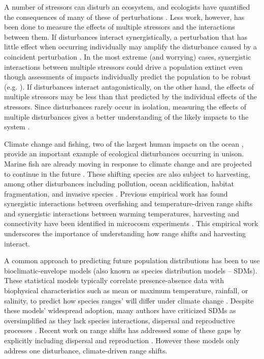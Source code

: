 \documentclass[12pt,english]{article}
\begin{document}
\begin{spacing}{1.9}
\begin{flushleft}
A number of stressors can disturb an ecosystem, and ecologists have quantified the consequences of many of these of perturbations \citep{Wilcoveetal1998, Crainetal2008, DarlingCote2008}. Less work, however, has been done to measure the effects of multiple stressors and the interactions between them.  If disturbances interact synergistically, a perturbation that has little effect when occurring individually may amplify the disturbance caused by a coincident perturbation \citep{Crainetal2008, DarlingCote2008,Nyeetal2013,Gurevitchetal2000}.   In the most extreme (and worrying) cases, synergistic interactions between multiple stressors could drive a population extinct even though assessments of impacts individually predict the population to be robust (e.g. \citet{Pelletieretal2006}).  If disturbances interact antagonistically, on the other hand, the effects of multiple stressors may be less than that predicted by the individual effects of the stressors.  Since disturbances rarely occur in isolation, measuring the effects of multiple disturbances gives a better understanding of the likely impacts to the system \citep{DoakMorris2010, Fordhametal2013, Foltetal1999}.


Climate change and fishing, two of the largest human impacts on the ocean \citep{Halpernetal2008}, provide an important example of ecological disturbances occurring in unison. Marine fish are already moving in response to climate change \citep{ Perryetal2005, HiddinkHoftstede2008, Rijnsdorpetal2009, Dulvyetal2008, Simpsonetal2011, Pinskyetal2013} and are projected to continue in the future \citep{Kelletal2005, Mackenzieetal2007}. These shifting species are also subject to harvesting, among other disturbances including pollution, ocean acidification, habitat fragmentation, and invasive species \citep{Wilcoveetal1998, Salaetal2000, MEA2005, Pinskyetal2013, Barryetal1995, Nyeetal2009}. Previous empirical work has found synergistic interactions between overfishing and temperature-driven range shifts \citep{Lingetal2009} and synergistic interactions between warming temperatures, harvesting and connectivity have been identified in microcosm experiments \citep{Moraetal2007}. This empirical work underscores the importance of understanding how range shifts and harvesting interact. 

A common approach to predicting future population distributions has been to use bioclimatic-envelope models (also known as species distribution models -- SDMs). These statistical models typically correlate presence-absence data with biophysical characteristics such as mean or maximum temperature, rainfall, or salinity, to predict how species ranges' will differ under climate change \citep{Elithetal2006, GuisanThuiller2005, GuisanZimmerman2000}. Despite these models' widespread adoption, many authors have criticized SDMs as oversimplified as they lack species interactions, dispersal and reproductive processes \citep{KearneyPorter2009, Zarnetskeetal2012, Robinsonetal2011}.  Recent work on range shifts has addressed some of these gaps by explicitly including dispersal and reproduction \citep{Berestyckietal2009, ZhouKot2011}. However these models only address one disturbance, climate-driven range shifts.


\end{flushleft}
\end{spacing}
\end{document}
